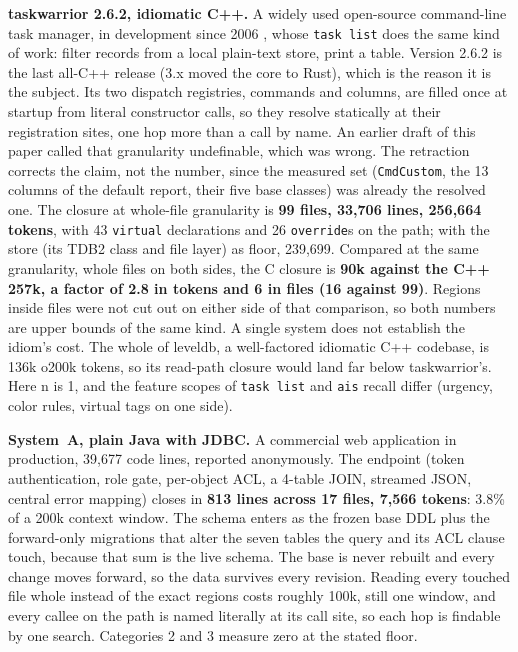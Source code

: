 \documentclass[journal]{IEEEtran}
\begin{document}
\textbf{taskwarrior 2.6.2, idiomatic C++.} A widely used open-source
command-line task manager, in development since 2006 \cite{taskwarrior},
whose \texttt{task list} does the same kind of work: filter records from a local
plain-text store, print a table. Version 2.6.2 is the last all-C++ release
(3.x moved the core to Rust), which is the reason it is the subject. Its two
dispatch registries, commands and columns, are filled once at startup from
literal constructor calls, so they resolve statically at their registration
sites, one hop more than a call by name. An earlier draft of this paper
called that granularity undefinable, which was wrong. The retraction
corrects the claim, not the number, since the measured set
(\texttt{CmdCustom}, the 13 columns of the default report, their five base
classes) was already the resolved one. The closure at whole-file
granularity is \textbf{99
files, 33,706 lines, 256,664 tokens}, with 43 \texttt{virtual} declarations
and 26 \texttt{override}s on the path; with the store (its TDB2 class and file layer) as
floor, 239,699. Compared at the same granularity, whole files on
both sides, the C closure is \textbf{90k against the C++ 257k, a factor of
2.8 in tokens and 6 in files (16 against 99)}. Regions inside files were not
cut out on either side of that comparison, so both numbers are upper bounds
of the same kind. A single
system does not establish the idiom's cost. The whole of leveldb, a well-factored idiomatic C++
codebase, is 136k o200k tokens, so its read-path closure would land far below
taskwarrior's. Here n is 1, and the feature scopes of \texttt{task list} and
\texttt{ais} recall differ (urgency, color rules, virtual tags on one side).

\textbf{System~A, plain Java with JDBC.} A commercial web application in
production, 39,677 code lines, reported anonymously. The endpoint (token
authentication, role gate, per-object ACL, a 4-table JOIN, streamed JSON,
central error mapping) closes in \textbf{813 lines across 17 files, 7,566
tokens}: 3.8\% of a 200k context window. The schema enters as the frozen
base DDL plus the forward-only migrations that alter the seven tables the
query and its ACL clause touch, because that sum is the live schema. The
base is never rebuilt and every change moves forward, so the data survives
every revision. Reading every touched file whole instead of the exact
regions costs roughly 100k, still one window, and every callee on the path
is named literally at its call site, so each hop is findable by one search.
Categories 2 and 3 measure zero at the stated floor.
\end{document}
